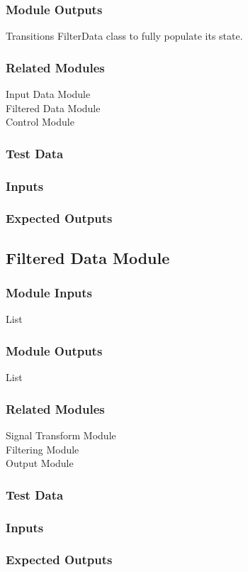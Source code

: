 \documentclass[12pt]{article}
\begin{document}
\subsubsection{Module Outputs}
Transitions FilterData class to fully populate its state.
\subsubsection{Related Modules}
Input Data Module\\
Filtered Data Module\\
Control Module
\subsubsection{Test Data}

\subsubsection{Inputs}

\subsubsection{Expected Outputs}



\subsection{Filtered Data Module}	

\subsubsection{Module Inputs}
List
\subsubsection{Module Outputs}
List
\subsubsection{Related Modules}
Signal Transform Module\\
Filtering Module\\
Output Module
\subsubsection{Test Data}

\subsubsection{Inputs}

\subsubsection{Expected Outputs}
\end{document}

